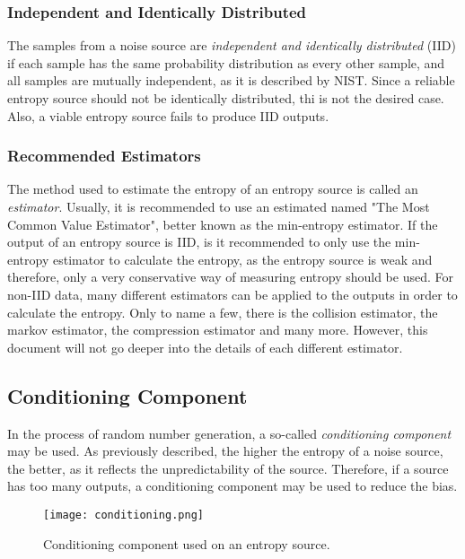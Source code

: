 \subsubsection{Independent and Identically Distributed}
The samples from a noise source are \emph{independent and identically distributed} (IID) if each sample
has the same probability distribution as every other sample, and all samples are mutually
independent, as it is described by NIST\cite{randomness:sources1}.
Since a reliable entropy source should not be identically distributed, thi is not the desired case. Also, a viable entropy source fails to produce IID outputs.

\subsubsection{Recommended Estimators}
The method used to estimate the entropy of an entropy source is called an \emph{estimator}. Usually, it is recommended to use an estimated named "The Most Common Value Estimator", better known as the min-entropy estimator.
\newline
If the output of an entropy source is IID, is it recommended to only use the min-entropy estimator to calculate the entropy, as the entropy source is weak and therefore, only a very conservative way of measuring entropy should be used.
\emptyline
For non-IID data, many different estimators can be applied to the outputs in order to calculate the entropy. Only to name a few, there is the collision estimator, the markov estimator, the compression estimator and many more.
However, this document will not go deeper into the details of each different estimator.


\subsection{Conditioning Component}
\label{conditioning}
In the process of random number generation, a so-called \emph{conditioning component} may be used.
As previously described, the higher the entropy of a noise source, the better, as it reflects the unpredictability of the source.
Therefore, if a source has too many outputs, a conditioning component may be used to reduce the bias\cite{randomness:generation1}.
\begin{figure}[H]
    \centering
    \texttt{[image: conditioning.png]}
    \caption{Conditioning component used on an entropy source\cite{randomness:sources1}.}
\end{figure}

